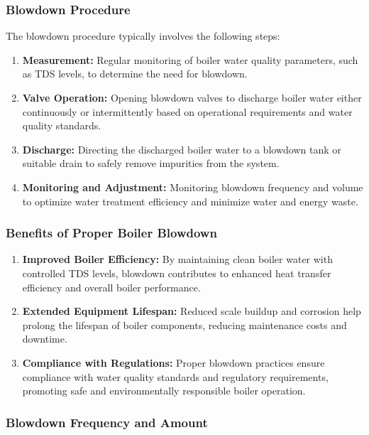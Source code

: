 \subsubsection{Blowdown Procedure}

The blowdown procedure typically involves the following steps:
\begin{enumerate}
    \item \textbf{Measurement:} Regular monitoring of boiler water quality parameters, such as TDS levels, to determine the need for blowdown.
    \item \textbf{Valve Operation:} Opening blowdown valves to discharge boiler water either continuously or intermittently based on operational requirements and water quality standards.
    \item \textbf{Discharge:} Directing the discharged boiler water to a blowdown tank or suitable drain to safely remove impurities from the system.
    \item \textbf{Monitoring and Adjustment:} Monitoring blowdown frequency and volume to optimize water treatment efficiency and minimize water and energy waste.
\end{enumerate}

\subsubsection{Benefits of Proper Boiler Blowdown}

\begin{enumerate}
    \item \textbf{Improved Boiler Efficiency:} By maintaining clean boiler water with controlled TDS levels, blowdown contributes to enhanced heat transfer efficiency and overall boiler performance.
    \item \textbf{Extended Equipment Lifespan:} Reduced scale buildup and corrosion help prolong the lifespan of boiler components, reducing maintenance costs and downtime.
    \item \textbf{Compliance with Regulations:} Proper blowdown practices ensure compliance with water quality standards and regulatory requirements, promoting safe and environmentally responsible boiler operation.
\end{enumerate}

\subsubsection{Blowdown Frequency and Amount}

